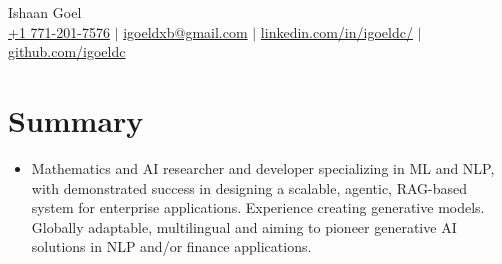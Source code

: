 \documentclass[letterpaper,10pt]{article}
\newcommand\indentsize{10pt}
\newcommand{\resumeSubHeadingListStart}{\begin{itemize}[leftmargin=0.15in, label=]}
\newcommand{\resumeSubHeadingListEnd}{\end{itemize}}
\begin{document}

\begin{center}
    \Huge Ishaan Goel \\ \vspace{2pt}
    \large
    \href{tel:17712017576}{+1 771-201-7576}
    $|$ \href{mailto:igoeldxb@gmail.com}{igoeldxb@gmail.com}
    $|$ \href{https://linkedin.com/in/igoeldc/}{linkedin.com/in/igoeldc/}
    $|$ 
    \href{https://github.com/igoeldc}{github.com/igoeldc}
\end{center}

\section{Summary}
  \resumeSubHeadingListStart
    \item{Mathematics and AI researcher and developer specializing in ML and NLP, with demonstrated success in designing a scalable, agentic, RAG-based system for enterprise applications. Experience creating generative models. Globally adaptable, multilingual and aiming to pioneer generative AI solutions in NLP and/or finance applications.}\vspace{-5pt}
  \resumeSubHeadingListEnd

\newcommand{\resumeEducationHeading}[9]{
  \item
    \begin{tabular*}{0.97\textwidth}[t]{l@{\extracolsep{\fill}}r}
      \textbf{#1} {#2} & #3 \\
      \hspace{\indentsize} #4 & #5 \\
      \hspace{20pt} #6 & \\
      \hspace{20pt} \textit{#7} & \\
      \hspace{\indentsize} #8 & #9
    \end{tabular*}
}
\end{document}
